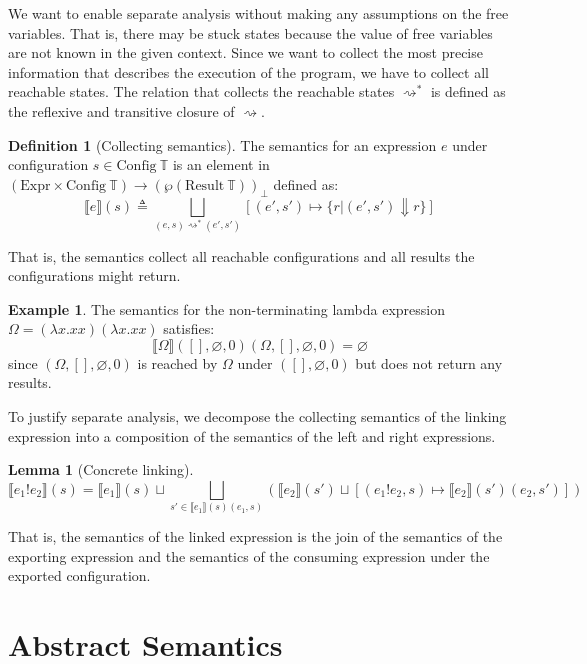 \documentclass{article}
\theoremstyle{definition}
\newtheorem{definition}{Definition}[section]
\newtheorem{lem}{Lemma}[section]
\newtheorem{example}{Example}[section]
\newcommand*{\Expr}{\text{Expr}}
\newcommand*{\Time}{\mathbb{T}}
\newcommand*{\Config}[1]{\text{Config}\:{#1}}
\newcommand*{\Result}[1]{\text{Result}\:{#1}}
\newcommand*{\link}[2]{{#1}\mathtt{!}{#2}}
\newcommand*{\sembracket}[1]{\lBrack{#1}\rBrack}
\begin{document}
We want to enable separate analysis without making any assumptions on the free variables.
That is, there may be stuck states because the value of free variables are not known in the given context.
Since we want to collect the most precise information that describes the execution of the program, we have to collect all reachable states.
The relation that collects the reachable states $\rightsquigarrow^{*}$ is defined as the reflexive and transitive closure of $\rightsquigarrow$.

\begin{definition}[Collecting semantics]
  The semantics for an expression $e$ under configuration $s\in\Config{\Time}$ is an element in $(\Expr\times\Config{\Time})\rightarrow(\wp(\Result{\Time}))_{\bot}$ defined as:
  \[
    \sembracket{e}(s)\triangleq\bigsqcup_{(e,s)\rightsquigarrow^{*}(e',s')}[(e',s')\mapsto\{r|(e',s')\Downarrow r\}]
  \]

  That is, the semantics collect all reachable configurations and all results the configurations might return.
\end{definition}

\begin{example}
  The semantics for the non-terminating lambda expression $\Omega=(\lambda x.xx)(\lambda x.xx)$ satisfies:
  \[
    \sembracket{\Omega}([],\varnothing,0)(\Omega,[],\varnothing,0)=\varnothing
  \]
  since $(\Omega,[],\varnothing,0)$ is reached by $\Omega$ under $([],\varnothing,0)$ but does not return any results.
\end{example}

To justify separate analysis, we decompose the collecting semantics of the linking expression into a composition of the semantics of the left and right expressions.
\begin{lem}[Concrete linking]
  \[
    \sembracket{\link{e_1}{e_2}}(s)=\sembracket{e_1}(s)\sqcup\bigsqcup_{s'\in\sembracket{e_1}(s)(e_1,s)}\left(\sembracket{e_2}(s')\sqcup[(\link{e_1}{e_2},s)\mapsto\sembracket{e_2}(s')(e_2,s')]\right)
  \]

  That is, the semantics of the linked expression is the join of the semantics of the exporting expression and the semantics of the consuming expression under the exported configuration.
\end{lem}

\section{Abstract Semantics}
\end{document}
